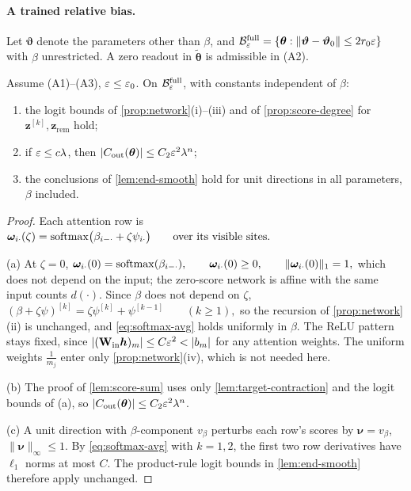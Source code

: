 \paragraph{A trained relative bias.} Let $\bm\vartheta$ denote the parameters other than $\beta$, and
$\mathcal B^{\mathrm{full}}_{\varepsilon}=\{\bm\theta:\|\bm\vartheta-\bm\vartheta_0\|\le2r_0\varepsilon\}$ with $\beta$ unrestricted. A zero readout in $\tilde{\bm\theta}$ is admissible in (A2).

\begin{lemma}
\label{lem:bias-uniform}
Assume (A1)--(A3), $\varepsilon\le\varepsilon_0$. On $\mathcal B^{\mathrm{full}}_{\varepsilon}$, with constants independent of $\beta$:
\begin{enumerate}[label=(\alph*),leftmargin=*,itemsep=3pt,topsep=4pt]
\item the logit bounds of \cref{prop:network}(i)--(iii) and of \cref{prop:score-degree} for $\bm z^{[k]},\bm z_{\mathrm{rem}}$ hold;
\item if $\varepsilon\le c\lambda$, then $|C_{\mathrm{out}}(\bm\theta)|\le C_2\varepsilon^2\lambda^n$;
\item the conclusions of \cref{lem:end-smooth} hold for unit directions in all parameters, $\beta$ included.
\end{enumerate}
\end{lemma}

\begin{proof}
Each attention row is
 $\bm\omega_{i\cdot}(\zeta)=\operatorname{softmax}\bigl(\beta_{i-\cdot}+\zeta\psi_{i\cdot}\bigr)\qquad\text{over its visible sites.}$ 

\noindent(a) At $\zeta=0$,
 $\bm\omega_{i\cdot}(0)=\operatorname{softmax}(\beta_{i-\cdot}),\qquad \bm\omega_{i\cdot}(0)\ge0,\qquad \|\bm\omega_{i\cdot}(0)\|_1=1,$ 
which does not depend on the input; the zero-score network is affine with the same input counts $d(\cdot)$. Since $\beta$ does not
depend on $\zeta$,
 $(\beta+\zeta\psi)^{[k]}=\zeta\psi^{[k]}+\psi^{[k-1]}\qquad(k\ge1),$ 
so the recursion of \cref{prop:network}(ii) is unchanged, and \cref{eq:softmax-avg} holds uniformly in $\beta$. The ReLU pattern stays
fixed, since $|(\mathbf W_{\mathrm{in}}\bm h)_m|\le C\initscale^2<|b_m|$ for any attention weights. The uniform weights $\frac{1}{m_j}$ enter only
\cref{prop:network}(iv), which is not needed here.

\smallskip\noindent(b) The proof of \cref{lem:score-sum} uses only \cref{lem:target-contraction} and the logit bounds of (a), so
$|C_{\mathrm{out}}(\bm\theta)|\le C_2\varepsilon^2\lambda^n$.

\smallskip\noindent(c) A unit direction with $\beta$-component $v_\beta$ perturbs each row's scores by $\bm\nu=v_\beta$, $\|\bm\nu\|_\infty\le1$. By
\cref{eq:softmax-avg} with $k=1,2$, the first two row derivatives have $\ell_1$ norms at most $C$. The product-rule logit bounds in \cref{lem:end-smooth} therefore apply unchanged.
\end{proof}

